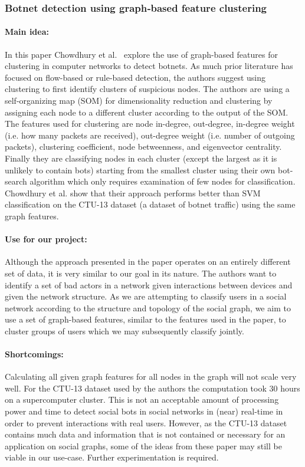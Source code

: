 \subsubsection{Botnet detection using graph‐based feature clustering}

\paragraph{Main idea:}
In this paper Chowdhury et al.~\cite{chowdhury2017botnet} explore the use of graph-based features for clustering in computer networks to detect botnets. As much prior literature has focused on flow-based or rule-based detection, the authors suggest using clustering to first identify clusters of suspicious nodes. The authors are using a self-organizing map (SOM) for dimensionality reduction and clustering by assigning each node to a different cluster according to the output of the SOM. The features used for clustering are node in-degree, out-degree, in-degree weight (i.e. how many packets are received), out-degree weight (i.e. number of outgoing packets), clustering coefficient, node betweenness, and eigenvector centrality. Finally they are classifying nodes in each cluster (except the largest as it is unlikely to contain bots) starting from the smallest cluster using their own bot-search algorithm which only requires examination of few nodes for classification.
Chowdhury et al. show that their approach performs better than SVM classification on the CTU-13 dataset (a dataset of botnet traffic) using the same graph features.

\paragraph{Use for our project:}
Although the approach presented in the paper operates on an entirely different set of data, it is very similar to our goal in its nature. The authors want to identify a set of bad actors in a network given interactions between devices and given the network structure. As we are attempting to classify users in a social network according to the structure and topology of the social graph, we aim to use a set of graph-based features, similar to the features used in the paper, to cluster groups of users which we may subsequently classify jointly.

\paragraph{Shortcomings:}
Calculating all given graph features for all nodes in the graph will not scale very well. For the CTU-13 dataset used by the authors the computation took 30 hours on a supercomputer cluster. This is not an acceptable amount of processing power and time to detect social bots in social networks in (near) real-time in order to prevent interactions with real users. However, as the CTU-13 dataset contains much data and information that is not contained or necessary for an application on social graphs, some of the ideas from these paper may still be viable in our use-case. Further experimentation is required.

